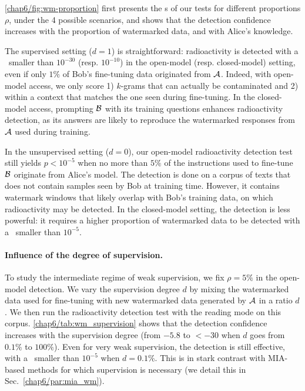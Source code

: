 \autoref{chap6/fig:wm-proportion} first presents the \pval s of our tests for different proportions $\rho$, under the 4 possible scenarios, and shows that the detection confidence increases with the proportion of watermarked data, and with Alice's knowledge.

The supervised setting ($d=1$) is straightforward: radioactivity is detected with a \pval\ smaller than $10^{-30}$ (resp. $10^{-10}$) in the open-model (resp. closed-model) setting, even if only $1\%$ of Bob's fine-tuning data originated from $\mathcal A$.
Indeed, with open-model access, we only score 1) $k$-grams that can actually be contaminated and 2) within a context that matches the one seen during fine-tuning.
In the closed-model access, prompting $\mathcal B$ with its training questions enhances radioactivity detection, as its answers are likely to reproduce the watermarked responses from $\mathcal A$ used during training.

In the unsupervised setting ($d=0$), our open-model radioactivity detection test still yields $p<10^{-5}$ when no more than $5\%$ of the instructions used to fine-tune $\mathcal B$ originate from Alice's model.
The detection is done on a corpus of texts that does not contain samples seen by Bob at training time.
However, it contains watermark windows that likely overlap with Bob's training data, on which radioactivity may be detected.
In the closed-model setting, the detection is less powerful: it requires a higher proportion of watermarked data to be detected with a \pval\ smaller than $10^{-5}$.











\paragraph{Influence of the degree of supervision.}
To study the intermediate regime of weak supervision, we fix $\rho=5\%$ in the open-model detection. 
We vary the supervision degree $d$ by mixing the watermarked data used for fine-tuning with new watermarked data generated by $\mathcal A$ in a ratio $d$. 
We then run the radioactivity detection test with the reading mode on this corpus.
\autoref{chap6/tab:wm_supervision} shows that the detection confidence increases with the supervision degree (from $-5.8$ to $<-30$ when $d$ goes from $0.1\%$ to $100\%$).
Even for very weak supervision, the detection is still effective, with a \pval\ smaller than $10^{-5}$ when $d=0.1\%$.
This is in stark contrast with MIA-based methods for which supervision is necessary (we detail this in Sec.~\ref{chap6/par:mia_wm}).

